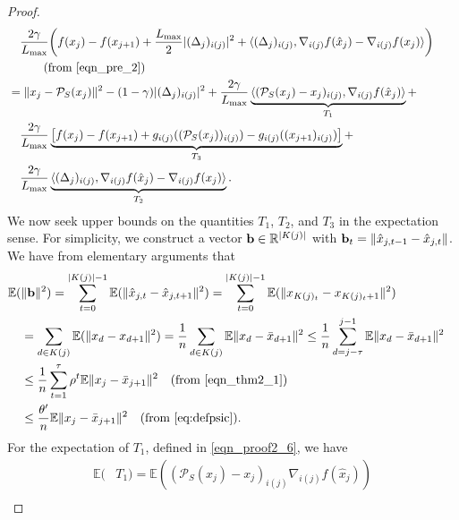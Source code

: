 \documentclass{siamltex}
\begin{document}
\begin{proof}
\begin{alignat}{2}
\nonumber
&\quad  \frac{2\gamma}{L_{\mbox{\rm\scriptsize max}}}\bigg(f(x_j) -  f(x_{j+1})  + {{L_{\mbox{\rm\scriptsize max}}}\over 2}|(\Delta_j)_{i(j)}|^2 +  \langle (\Delta_j)_{i(j)}, \nabla_{i(j)} f({\hat{x}}_{j}) - \nabla_{i(j)} f(x_{j})\rangle \bigg) 
\\ \nonumber
& \quad \quad \quad 
(\text{from \eqref{eqn_pre_2}})\\
\nonumber
& = \|x_j - {\mathcal{P}_{S}}(x_j)\|^2 - (1-\gamma)|(\Delta_j)_{i(j)}|^2 + \frac{2\gamma}{L_{\mbox{\rm\scriptsize max}}} \underbrace{\langle ({\mathcal{P}_{S}}(x_j)-x_j)_{i(j)}, \nabla_{i(j)} f({\hat{x}}_{j})\rangle}_{T_1} +&& \\
\nonumber 
&\quad \frac{2\gamma}{L_{\mbox{\rm\scriptsize max}}}\underbrace{\left[f(x_j) -  f(x_{j+1}) + g_{i(j)}(({\mathcal{P}_{S}}(x_j))_{i(j)}) - g_{i(j)}((x_{j+1})_{i(j)})  \right]}_{T_3} + &&
\\ \label{eqn_proof2_6} &\quad
\frac{2\gamma}{L_{\mbox{\rm\scriptsize max}}}\underbrace{\langle (\Delta_j)_{i(j)}, \nabla_{i(j)} f({\hat{x}}_{j}) - \nabla_{i(j)} f(x_{j}) \rangle}_{T_2}. &&
\end{alignat}
We now seek upper bounds on the quantities $T_1$, $T_2$, and $T_3$ in
the expectation sense. For simplicity, we construct a vector
$\bold{b}\in{\mathbb{R}}^{|K(j)|}$ with $\bold{b}_t = \|{\hat{x}}_{j, t-1}-{\hat{x}}_{j,
  t}\|$. We have from elementary arguments that
\begin{alignat}{2}
\nonumber
{\mathbb{E}}( & \|\bold{b}\|^2) = \sum_{t=0}^{|K(j)|-1} {\mathbb{E}} (\|{\hat{x}}_{j, t}-{\hat{x}}_{j, t+1}\|^2) = \sum_{t=0}^{|K(j)|-1} {\mathbb{E}} (\|x_{K(j)_t}-x_{K(j)_t+1}\|^2) && \\ 
\nonumber 
& =
\sum_{d\in K(j)} {\mathbb{E}} (\|x_{d}-x_{d+1}\|^2) = \frac{1}{n} \sum_{d\in K(j)} {\mathbb{E}}\|x_d-\bar{x}_{d+1}\|^2 
\leq \frac{1}{n}\sum_{d=j-\tau}^{j-1} {\mathbb{E}}\|x_d-\bar{x}_{d+1}\|^2 && \\ 
\nonumber 
& \leq \frac{1}{n} \sum_{t=1}^{\tau} \rho^{t}{\mathbb{E}}\|x_j-\bar{x}_{j+1}\|^2 \quad  (\text{from \eqref{eqn_thm2_1}})
\\ 
\label{eq:b}
& \leq {\theta' \over n} {\mathbb{E}}\|x_j-\bar{x}_{j+1}\|^2 \quad (\text{from \eqref{eq:defpsic}}).
\end{alignat}
For the expectation of $T_1$, defined in \eqref{eqn_proof2_6}, we have
\begin{align}
\nonumber 
{\mathbb{E}}( & T_1) = {\mathbb{E}} \left( ({\mathcal{P}_{S}}(x_j)-x_j)_{i(j)} \nabla_{i(j)} f({\hat{x}}_{j}) \right) \\

\end{align}
\end{proof}
\end{document}
